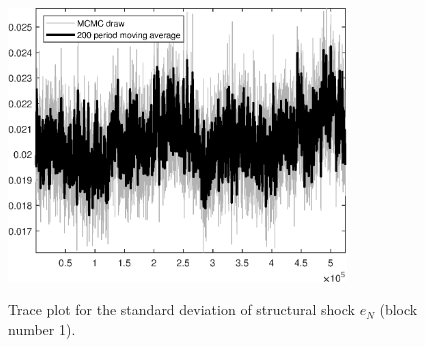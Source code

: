 \begin{figure}[H]
\centering
  \includegraphics[width=0.8\textwidth]{BRS_growth_KPR/graphs/TracePlot_SE_e_N_blck_1}\\
    \caption{Trace plot for the standard deviation of structural shock ${e_N}$ (block number 1).}
\end{figure}

